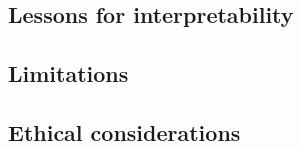 \subsection{Lessons for interpretability}

\subsection{Limitations}
\label{sec:limitations}

\subsection{Ethical considerations}
